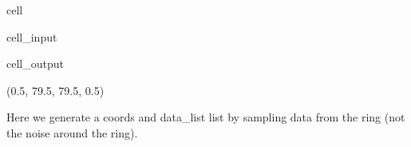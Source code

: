 \documentclass[letterpaper,10pt,english]{jupyterBook}
\begin{document}
\begin{sphinxuseclass}{cell}\begin{sphinxVerbatimInput}

\begin{sphinxuseclass}{cell_input}
\begin{sphinxVerbatim}[commandchars=\\\{\}]
   
\end{sphinxVerbatim}

\end{sphinxuseclass}\end{sphinxVerbatimInput}
\begin{sphinxVerbatimOutput}

\begin{sphinxuseclass}{cell_output}
\begin{sphinxVerbatim}[commandchars=\\\{\}]
(\PYGZhy{}0.5, 79.5, 79.5, \PYGZhy{}0.5)
\end{sphinxVerbatim}

\noindent{}

\end{sphinxuseclass}\end{sphinxVerbatimOutput}

\end{sphinxuseclass}
\sphinxAtStartPar
Here we generate a coords and data\_list list by sampling data from the ring (not the noise around the ring).
\end{document}
